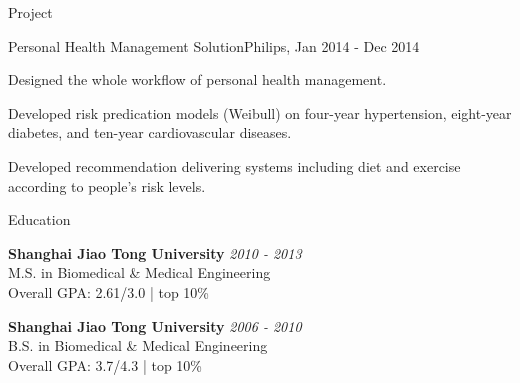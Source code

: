 \documentclass{resume} %
\begin{document}
\begin{rSection}{Project}

\begin{rSubsection}{Personal Health Management Solution}{}{Philips, Jan 2014 - Dec 2014}{}
\item Designed the whole workflow of personal health management.
\item Developed risk predication models (Weibull) on four-year hypertension, eight-year diabetes, and ten-year cardiovascular diseases.
\item Developed recommendation delivering systems including diet and exercise according to people's risk levels.
\end{rSubsection}

\end{rSection}


\begin{rSection}{Education}

{\bf Shanghai Jiao Tong University} \hfill {\em 2010 - 2013} \\ 
M.S. in Biomedical \& Medical Engineering \\
Overall GPA: 2.61/3.0 | top 10\%

{\bf Shanghai Jiao Tong University} \hfill {\em 2006 - 2010} \\ 
B.S. in Biomedical \& Medical Engineering \\
Overall GPA: 3.7/4.3 | top 10\%

\end{rSection}

\end{document}
